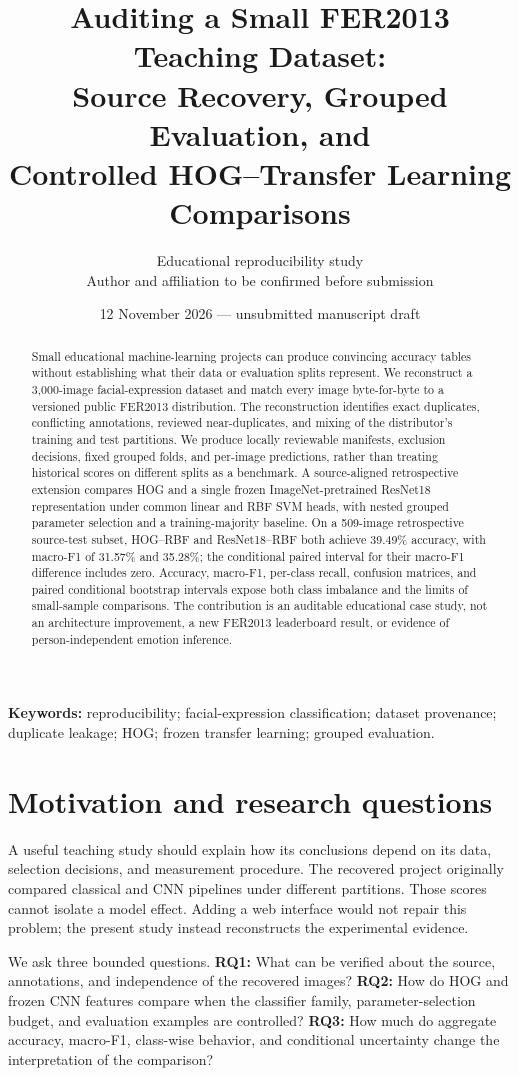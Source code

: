 \documentclass[11pt,a4paper]{article}
\title{Auditing a Small FER2013 Teaching Dataset:\\Source Recovery, Grouped Evaluation, and\\Controlled HOG--Transfer Learning Comparisons}
\author{Educational reproducibility study\\\small Author and affiliation to be confirmed before submission}
\date{12 November 2026 --- unsubmitted manuscript draft}
\begin{document}
\maketitle
\begin{abstract}
Small educational machine-learning projects can produce convincing accuracy
tables without establishing what their data or evaluation splits represent.
We reconstruct a 3,000-image facial-expression dataset and match every image
byte-for-byte to a versioned public FER2013 distribution. The reconstruction
identifies exact duplicates, conflicting annotations, reviewed near-duplicates,
and mixing of the distributor's training and test partitions. We produce locally
reviewable manifests, exclusion decisions, fixed grouped folds, and per-image
predictions, rather than treating historical scores on different splits as a
benchmark. A source-aligned retrospective extension compares HOG and a single
frozen ImageNet-pretrained ResNet18 representation under common linear and RBF
SVM heads, with nested grouped parameter selection and a training-majority
baseline. On a 509-image retrospective source-test subset, HOG--RBF and
ResNet18--RBF both achieve 39.49\% accuracy, with macro-F1 of 31.57\% and
35.28\%; the conditional paired interval for their macro-F1 difference includes
zero. Accuracy, macro-F1, per-class recall, confusion matrices, and paired
conditional bootstrap intervals expose both class imbalance and the limits of
small-sample comparisons. The contribution is an auditable educational case
study, not an architecture improvement, a new FER2013 leaderboard result, or
evidence of person-independent emotion inference.
\end{abstract}
\textbf{Keywords:} reproducibility; facial-expression classification; dataset
provenance; duplicate leakage; HOG; frozen transfer learning; grouped evaluation.

\section{Motivation and research questions}
A useful teaching study should explain how its conclusions depend on its data,
selection decisions, and measurement procedure. The recovered project originally
compared classical and CNN pipelines under different partitions. Those scores
cannot isolate a model effect. Adding a web interface would not repair this
problem; the present study instead reconstructs the experimental evidence.

We ask three bounded questions. \textbf{RQ1:} What can be verified about the
source, annotations, and independence of the recovered images?
\textbf{RQ2:} How do HOG and frozen CNN features compare when the classifier
family, parameter-selection budget, and evaluation examples are controlled?
\textbf{RQ3:} How much do aggregate accuracy, macro-F1, class-wise behavior,
and conditional uncertainty change the interpretation of the comparison?
\end{document}
